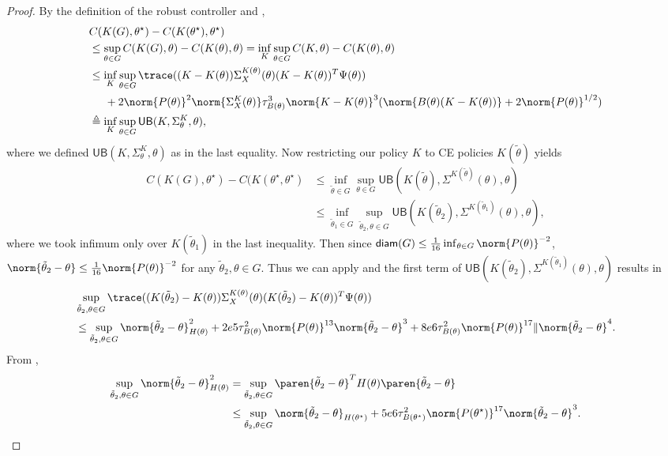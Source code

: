 \begin{proof}
    By the definition of the robust controller and ,
    \begin{align*}
        &C(K(G), \theta^\star) - C(K(\theta^\star), \theta^\star) \\
        &\leq \sup_{\theta\in G}C(K(G), \theta) - C(K(\theta), \theta) = \inf_K\sup_{\theta\in G}C(K, \theta) - C(K(\theta), \theta) \\
        &\leq \inf_K\sup_{\theta\in G} \trace ((K-K(\theta))\Sigma_X^{K(\theta)}(\theta)(K-K(\theta))^T\Psi(\theta))\\
        &\hspace{5mm}+ 2 \norm{P(\theta)}^2 \norm{\Sigma_X^{K}(\theta)}\tau_{B(\theta)}^3\norm{K-K(\theta)}^3(\norm{B(\theta)(K-K(\theta))} + 2 \norm{P(\theta)}^{1/2}) \\
        &\triangleq \inf_K\sup_{\theta\in G}\mathsf{UB}(K, \Sigma^K_{\theta}, \theta),
    \end{align*}
    where we defined $\mathsf{UB}(K, \Sigma^K_{\theta}, \theta)$ as in the last equality.  
    Now restricting our policy $K$ to CE policies $K(\tilde\theta)$ yields
    \begin{align*}
        C(K(G), \theta^\star) - C(K(\theta^\star, \theta^\star) 
        &\leq \inf_{\tilde\theta\in G}\sup_{\theta\in G}\mathsf{UB}(K(\tilde\theta), \Sigma^{K(\tilde\theta)}(\theta), \theta) \\
        &\leq \inf_{\tilde\theta_1\in G}\sup_{\tilde\theta_2, \theta\in G}\mathsf{UB}(K(\tilde\theta_2), \Sigma^{K(\tilde\theta_1)}(\theta), \theta), 
    \end{align*}
    where we took infimum only over $K(\tilde\theta_1)$ in the last inequality. 
    Then since $\mathsf{diam}(G)\leq\frac{1}{16}\inf_{\theta\in G}\norm{P(\theta)}^{-2}$, $\norm{\tilde\theta_2-\theta}\leq\frac{1}{16}\norm{P(\theta)}^{-2}$ for any $\tilde\theta_2, \theta\in G$. 
    Thus we can apply  and the first term of $\mathsf{UB}(K(\tilde\theta_2), \Sigma^{K(\tilde\theta_1)}(\theta), \theta)$ results in 
    \begin{align*}
        &\sup_{\tilde\theta_2, \theta\in G}\trace ((K(\tilde\theta_2)-K(\theta))\Sigma_X^{K(\theta)}(\theta)(K(\tilde\theta_2)-K(\theta))^T\Psi(\theta)) \\
        &\leq \sup_{\tilde\theta_2, \theta\in G}\norm{\tilde\theta_2-\theta}_{H(\theta)}^2 + 2e5\tau_{B(\theta)}^2\norm{P(\theta)}^{13}\norm{\tilde\theta_2-\theta}^3 + 8e6\tau_{B(\theta)}^2\norm{P(\theta)}^{17}\|\norm{\tilde\theta_2-\theta}^4 .
    \end{align*} 
    From , 
    \begin{align*}
        \sup_{\tilde\theta_2, \theta\in G}\norm{\tilde\theta_2-\theta}_{H(\theta)}^2
        &= \sup_{\tilde\theta_2, \theta\in G}\paren{\tilde\theta_2-\theta}^TH(\theta)\paren{\tilde\theta_2-\theta} \\
        &\leq  \sup_{\tilde\theta_2, \theta\in G}\norm{\tilde\theta_2-\theta}_{H(\theta^\star)} + 5e6\tau_{B(\theta^\star)}^2\norm{P(\theta^\star)}^{17}\norm{\tilde\theta_2-\theta}^3.
    \end{align*}
    

\end{proof}
